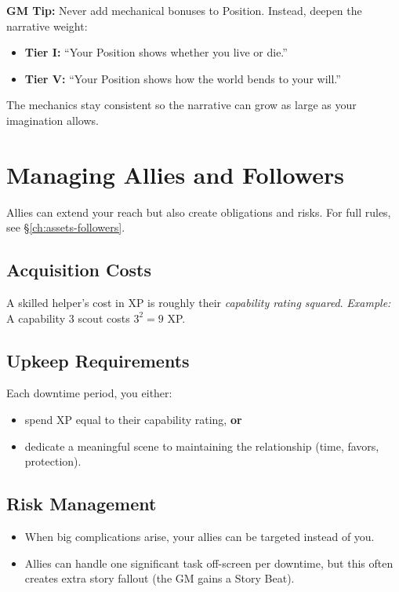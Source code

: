 \begin{tcolorbox}[colback=blue!5!white, colframe=blue!75!black, boxrule=0.5pt, arc=2mm,breakable]
\textbf{GM Tip:} Never add mechanical bonuses to Position. Instead, deepen the narrative weight:
\begin{itemize}
\item \textbf{Tier I:} ``Your Position shows whether you live or die.''
\item \textbf{Tier V:} ``Your Position shows how the world bends to your will.''
\end{itemize}
The mechanics stay consistent so the narrative can grow as large as your imagination allows.
\end{tcolorbox}

\newpage
\section{Managing Allies and Followers}
\label{sec:allies-followers}

Allies can extend your reach but also create obligations and risks. For full
rules, see \S\ref{ch:assets-followers}.

\subsection{Acquisition Costs}
\label{sec:follower-cost}
A skilled helper's cost in XP is roughly their \emph{capability rating squared}.
\emph{Example:} A capability 3 scout costs $3^2 = 9$ XP.

\subsection{Upkeep Requirements}
\label{sec:follower-upkeep}
Each downtime period, you either:
\begin{itemize}
  \item spend XP equal to their capability rating, \textbf{or}
  \item dedicate a meaningful scene to maintaining the relationship (time, favors, protection).
\end{itemize}

\subsection{Risk Management}
\label{sec:follower-risk}
\begin{itemize}
  \item When big complications arise, your allies can be targeted instead of you.
  \item Allies can handle one significant task off-screen per downtime, but this often creates extra story fallout (the GM gains a Story Beat).
\end{itemize}

